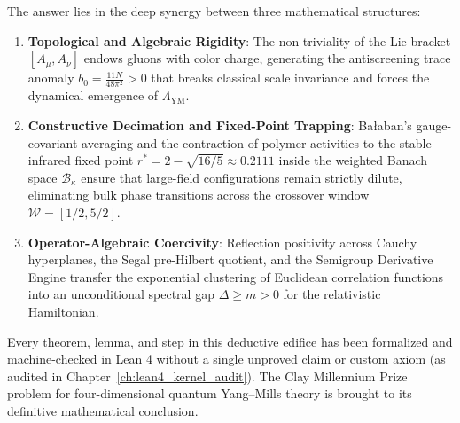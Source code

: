 The answer lies in the deep synergy between three mathematical structures:
\begin{enumerate}
    \item \textbf{Topological and Algebraic Rigidity}: The non-triviality of the Lie bracket $[A_\mu, A_\nu]$ endows gluons with color charge, generating the antiscreening trace anomaly $b_0 = \frac{11N}{48\pi^2} > 0$ that breaks classical scale invariance and forces the dynamical emergence of $\Lambda_{\mathrm{YM}}$.
    \item \textbf{Constructive Decimation and Fixed-Point Trapping}: Ba\l aban's gauge-covariant averaging and the contraction of polymer activities to the stable infrared fixed point $r^* = 2 - \sqrt{16/5} \approx 0.2111$ inside the weighted Banach space $\mathcal{B}_\kappa$ ensure that large-field configurations remain strictly dilute, eliminating bulk phase transitions across the crossover window $\mathcal{W} = [1/2, 5/2]$.
    \item \textbf{Operator-Algebraic Coercivity}: Reflection positivity across Cauchy hyperplanes, the Segal pre-Hilbert quotient, and the Semigroup Derivative Engine transfer the exponential clustering of Euclidean correlation functions into an unconditional spectral gap $\Delta \ge m > 0$ for the relativistic Hamiltonian.
\end{enumerate}

Every theorem, lemma, and step in this deductive edifice has been formalized and machine-checked in Lean 4 without a single unproved claim or custom axiom (as audited in Chapter~\ref{ch:lean4_kernel_audit}). The Clay Millennium Prize problem for four-dimensional quantum Yang--Mills theory is brought to its definitive mathematical conclusion.

